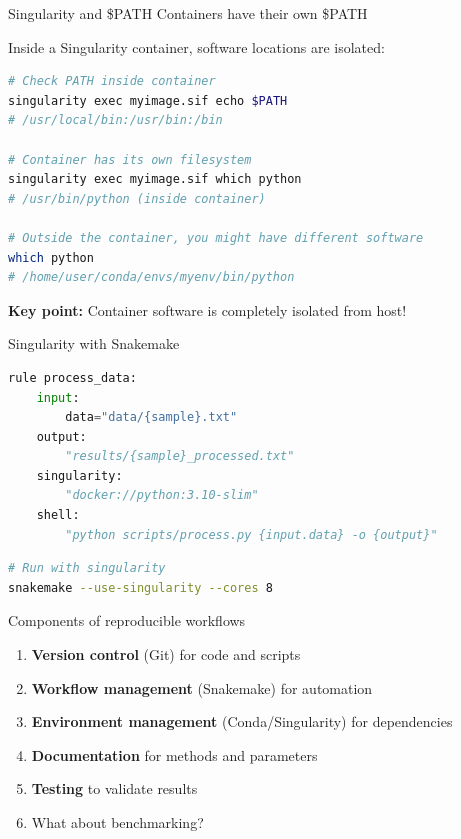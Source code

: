 \documentclass[aspectratio=169]{beamer}
\begin{document}
\begin{frame}[fragile]{Singularity and \$PATH}
    Containers have their own \$PATH
    
    Inside a Singularity container, software locations are isolated:
    
    \begin{lstlisting}[language=bash]
# Check PATH inside container
singularity exec myimage.sif echo $PATH
# /usr/local/bin:/usr/bin:/bin

# Container has its own filesystem
singularity exec myimage.sif which python
# /usr/bin/python (inside container)

# Outside the container, you might have different software
which python
# /home/user/conda/envs/myenv/bin/python
\end{lstlisting}
    
    \vspace{0.3cm}
    \textbf{Key point:} Container software is completely isolated from host!
\end{frame}

\begin{frame}[fragile]{Singularity with Snakemake}
    \begin{lstlisting}[language=Python]
rule process_data:
    input:
        data="data/{sample}.txt"
    output:
        "results/{sample}_processed.txt"
    singularity:
        "docker://python:3.10-slim"
    shell:
        "python scripts/process.py {input.data} -o {output}"
\end{lstlisting}
    
    \begin{lstlisting}[language=bash]
# Run with singularity
snakemake --use-singularity --cores 8
\end{lstlisting}
\end{frame}


\begin{frame}{Components of reproducible workflows}
    \begin{enumerate}
        \item \textbf{Version control} (Git) for code and scripts
        \item \textbf{Workflow management} (Snakemake) for automation
        \item \textbf{Environment management} (Conda/Singularity) for dependencies
        \item \textbf{Documentation} for methods and parameters
          \pause
        \item \textbf{Testing} to validate results
          \pause
        \item What about benchmarking?
    \end{enumerate}
    
\end{frame}
\end{document}
